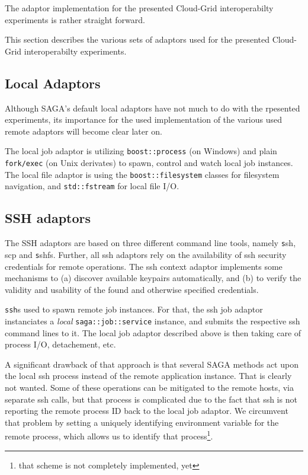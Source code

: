 \documentclass[conference,final]{IEEEtran}
\newcommand{\T}[1]{\texttt{#1}}
\newcommand{\I}[1]{\textit{#1}}
\newcommand{\ssh}[1]{\texttt{ssh}}
\begin{document}
 The adaptor implementation for the presented Cloud-Grid
 interoperabilty experiments is rather straight forward. 
 
 This section describes the various sets of adaptors used for the
 presented Cloud-Grid interoperabilty experiments.  


 \subsection{Local Adaptors}

  Although SAGA's default local adaptors have not much to do with the
  rpesented experiments, its importance for the used implementation of
  the various used remote adaptors will become clear later on.

  The local job adaptor is utilizing \T{boost::process} (on Windows)
  and plain \T{fork/exec} (on Unix derivates) to spawn, control and
  watch local job instances.  The local file adaptor is using the
  \T{boost::filesystem} classes for filesystem navigation, and
  \T{std::fstream} for local file I/O. %


 \subsection{SSH adaptors}

 The SSH adaptors are based on three different command line tools,
 namely {\texttt ssh, scp} and {\texttt sshfs}.  Further, all ssh
 adaptors rely on the availability of ssh security credentials for
 remote operations.  The ssh context adaptor implements some
 mechanisms to (a) discover available keypairs automatically, and (b)
 to verify the validity and usability of the found and otherwise
 specified credentials.
  
  \ssh is used to spawn remote job instances.  For that, the ssh job
  adaptor instanciates a \I{local} \T{saga::job::service} instance,
  and submits the respective ssh command lines to it.  The local job
  adaptor described above is then taking care of process I/O,
  detachement, etc.

  A significant drawback of that approach is that several SAGA methods
  act upon the local ssh process instead of the remote application
  instance.  That is clearly not wanted.  Some of these operations can
  be mitigated to the remote hosts, via separate ssh calls, but that
  process is complicated due to the fact that ssh is not reporting the
  remote process ID back to the local job adaptor.  We circumvent that
  problem by setting a uniquely identifying environment variable for
  the remote process, which allows us to identify that
  process\footnote{that scheme is not completely implemented, yet}.
\end{document}

